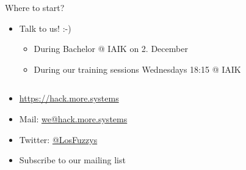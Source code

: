 \begin{frame}[fragile]
	{Where to start?}

	\begin{itemize}
    \item Talk to us! :-)
      \begin{itemize}
        \item During Bachelor @ IAIK on 2. December
        \item During our training sessions Wednesdays 18:15 @ IAIK
      \end{itemize}
  \end{itemize}

  \begin{columns}[T]
    \begin{column}{.55\textwidth}
      \begin{itemize}
        \item \url{https://hack.more.systems}
        \item Mail: \href{mailto:we@hack.more.systems}{we@hack.more.systems}
        \item Twitter: \href{https://twitter.com/LosFuzzys}{@LosFuzzys}
        \item Subscribe to our mailing list  %
      \end{itemize}

    \end{column}

    \begin{column}{.45\textwidth}
    \end{column}
  \end{columns}

\end{frame}


